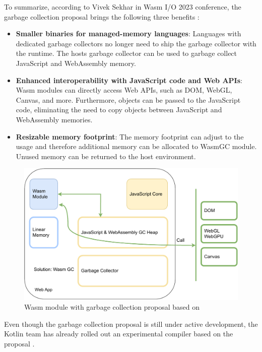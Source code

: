To summarize, according to Vivek Sekhar in Wasm I/O 2023 conference, the garbage collection proposal brings the following three benefits \cite{sekhar_2023_mobile}:
%
\begin{itemize}
  \item \textbf{Smaller binaries for managed-memory languages}: Languages with dedicated garbage collectors no longer need to ship the garbage collector with the runtime. The hosts garbage collector can be used to garbage collect JavaScript and WebAssembly memory.
  \item \textbf{Enhanced interoperability with JavaScript code and Web APIs}: Wasm modules can directly access Web APIs, such as DOM, WebGL, Canvas, and more. Furthermore, objects can be passed to the JavaScript code, eliminating the need to copy objects between JavaScript and WebAssembly memories.
  \item \textbf{Resizable memory footprint}: The memory footprint can adjust to the usage and therefore additional memory can be allocated to WasmGC module. Unused memory can be returned to the host environment.
\end{itemize}
%
\begin{figure}[htbp]
  \centering
      \includegraphics[width=1\linewidth]{images/wasm/wasm_gc_2.drawio.pdf}
  \caption{Wasm module with garbage collection proposal based on \cite{sekhar_2023_mobile}}
  \label{fig:wasm-gc-2}
\end{figure}
%
Even though the garbage collection proposal is still under active development, the Kotlin team has already rolled out an experimental compiler based on the proposal \cite{kotlin_2023_kotlin}.
